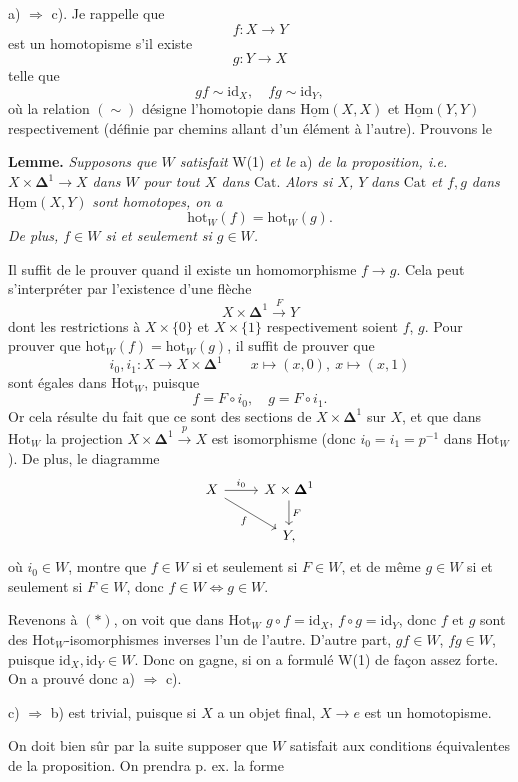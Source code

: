 \documentclass[11pt]{article}
\newcommand{\printedpage}[1]{\marginpar{\footnotesize p.~#1}}
\newcommand{\msp}[1]{\marginpar{\footnotesize [#1]}}
\newcommand{\Cat}{\mathrm{Cat}}
\newcommand{\Dl}{\boldsymbol{\Delta}}
\newcommand{\fl}{\longrightarrow}
\newcommand{\Hot}{\mathrm{Hot}}
\newcommand{\hot}{\mathrm{hot}}
\newcommand{\uHom}{\underline{\mathrm{Hom}}}
\newcommand{\id}{\mathrm{id}}
\begin{document}
a) $\Longrightarrow$ c). Je rappelle que
\[ f : X \fl Y \]
\msp{page 2}
est un homotopisme s'il existe
\[ g : Y \fl X \]
telle que
\[ gf \sim \id_X, \quad fg \sim \id_Y, \tag*{$(*)$} \]
où la relation $(\sim)$ désigne l'homotopie dans $\uHom(X,X)$ et $\uHom(Y,Y)$ respectivement (définie par chemins allant d'un élément à l'autre). Prouvons le

\textbf{Lemme.} \textit{Supposons que $W$ satisfait} W(1) \textit{et le} a) \textit{de la proposition, i.e. $X \times \Dl^1 \fl X$ dans $W$ pour tout $X$ dans} $\Cat$. \textit{Alors si $X$, $Y$} \textit{dans} $\Cat$ \textit{et $f, g$ dans} $\uHom(X,Y)$ \textit{sont homotopes, on a}
\[ \hot_W(f) = \hot_W(g). \]
\textit{De plus, $f \in W$ si et seulement si $g \in W$.}

Il suffit de le prouver quand il existe un homomorphisme $f \fl g$. Cela peut s'interpréter par l'existence d'une flèche
\[ X \times \Dl^1 \xrightarrow{F} Y \]
dont les restrictions à $X \times \{0\}$ et $X \times \{1\}$ respectivement soient $f$, $g$. Pour prouver que $\hot_W(f) = \hot_W(g)$, il suffit de prouver que
\[ i_0, i_1 : X \fl X \times \Dl^1 \qquad x \longmapsto (x,0),\ x \longmapsto (x,1) \]
\printedpage{3}
sont égales dans $\Hot_W$, puisque
\[ f = F \circ i_0, \quad g = F \circ i_1. \]
Or cela résulte du fait que ce sont des sections de $X \times \Dl^1$ sur $X$, et que dans $\Hot_W$ la projection $X \times \Dl^1 \xrightarrow{p} X$ est isomorphisme (donc $i_0 = i_1 = p^{-1}$ dans $\Hot_W$). De plus, le diagramme
\[
\begin{tikzcd}
X \arrow[r, "i_0"] \arrow[dr, "f"'] & X \times \Dl^1 \arrow[d, "F"] \\
& Y,
\end{tikzcd}
\]
où $i_0 \in W$, montre que $f \in W$ si et seulement si $F \in W$, et de même $g \in W$ si et seulement si $F \in W$, donc $f \in W \Longleftrightarrow g \in W$.

Revenons à $(*)$, on voit que dans $\Hot_W$ $g \circ f = \id_X$, $f \circ g = \id_Y$, donc $f$ et $g$ sont des $\Hot_W$-isomorphismes inverses l'un de l'autre. D'autre part, $gf \in W$, $fg \in W$, puisque $\id_X, \id_Y \in W$. Donc on gagne, si on a formulé W(1) de façon assez forte. On a prouvé donc a) $\Longrightarrow$ c).

c) $\Longrightarrow$ b) est trivial, puisque si $X$ a un objet final, $X \fl e$ est un homotopisme.

\msp{page 3}

On doit bien sûr par la suite supposer que $W$ satisfait aux conditions équivalentes de la proposition. On prendra p. ex. la forme
\end{document}
